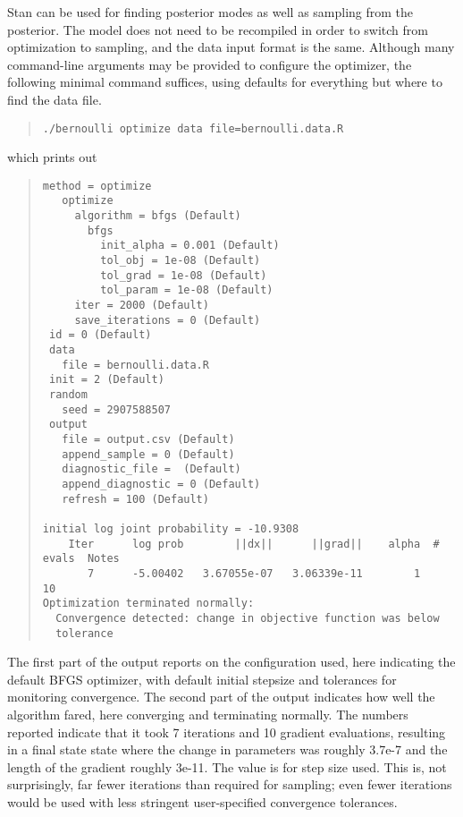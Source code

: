 Stan can be used for finding posterior modes as well as sampling from
the posterior.   The model does not need to be recompiled in order to
switch from optimization to sampling, and the data input format is the
same.  Although many command-line arguments may be provided to
configure the optimizer, the following minimal command suffices, using
defaults for everything but where to find the data file.
%
\begin{quote}
\begin{Verbatim}[fontshape=sl]
./bernoulli optimize data file=bernoulli.data.R
\end{Verbatim}
\end{quote}
%
which prints out
%
\begin{quote}
\begin{Verbatim}[fontsize=\footnotesize]
 method = optimize
   optimize
     algorithm = bfgs (Default)
       bfgs
         init_alpha = 0.001 (Default)
         tol_obj = 1e-08 (Default)
         tol_grad = 1e-08 (Default)
         tol_param = 1e-08 (Default)
     iter = 2000 (Default)
     save_iterations = 0 (Default)
 id = 0 (Default)
 data
   file = bernoulli.data.R
 init = 2 (Default)
 random
   seed = 2907588507
 output
   file = output.csv (Default)
   append_sample = 0 (Default)
   diagnostic_file =  (Default)
   append_diagnostic = 0 (Default)
   refresh = 100 (Default)

initial log joint probability = -10.9308
    Iter      log prob        ||dx||      ||grad||    alpha  # evals  Notes 
       7      -5.00402   3.67055e-07   3.06339e-11        1       10   
Optimization terminated normally: 
  Convergence detected: change in objective function was below
  tolerance
\end{Verbatim}
\end{quote}
%
The first part of the output reports on the configuration used, here
indicating the default BFGS optimizer, with default initial stepsize
and tolerances for monitoring convergence.  The second part of the
output indicates how well the algorithm fared, here converging and
terminating normally.  The numbers reported indicate that it took 7
iterations and 10 gradient evaluations, resulting in a final state
state where the change in parameters was roughly 3.7e-7 and the length
of the gradient roughly 3e-11.  The  value is for step
size used.  This is, not surprisingly, far fewer iterations than
required for sampling; even fewer iterations would be used with less
stringent user-specified convergence tolerances.


